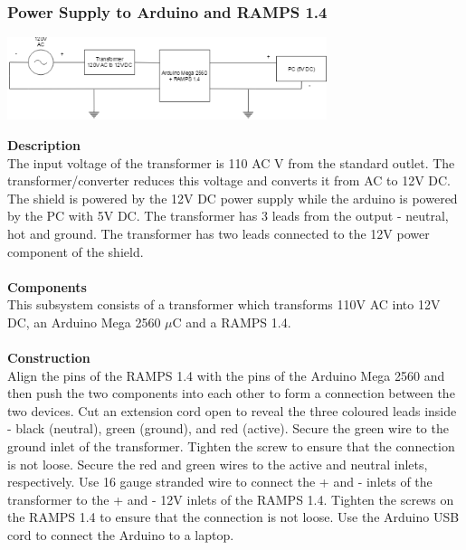 \documentclass[titlepage]{article}
\begin{document}
\subsubsection{Power Supply to Arduino and RAMPS 1.4}
\begin{center}
	\includegraphics[width = 0.7\textwidth]{PowerSupply.png}
\label{fig:PowerSupplyFig}
\end{center}
\textbf{Description}\\
The input voltage of the transformer is 110 AC V from the standard outlet. The transformer/converter reduces this voltage and converts it from AC to 12V DC. The shield is powered by the 12V DC power supply while the arduino is powered by the PC with 5V DC. The transformer has 3 leads from the output - neutral, hot and ground. The transformer has two leads connected to the 12V power component of the shield.\\\\
\textbf{Components}\\
This subsystem consists of a transformer which transforms 110V AC into 12V DC, an Arduino Mega 2560 $\mu$C and a RAMPS 1.4.\\\\
\textbf{Construction}\\
Align the pins of the RAMPS 1.4 with the pins of the Arduino Mega 2560 and then push the two components into each other to form a connection between the two devices. Cut an extension cord open to reveal the three coloured leads inside - black (neutral), green (ground), and red (active). Secure the green wire to the ground inlet of the transformer. Tighten the screw to ensure that the connection is not loose. Secure the red and green wires to the active and neutral inlets, respectively. Use 16 gauge stranded wire to connect the + and - inlets of the transformer to the + and - 12V inlets of the RAMPS 1.4. Tighten the screws on the RAMPS 1.4 to ensure that the connection is not loose. Use the Arduino USB cord to connect the Arduino to a laptop.
\end{document}
